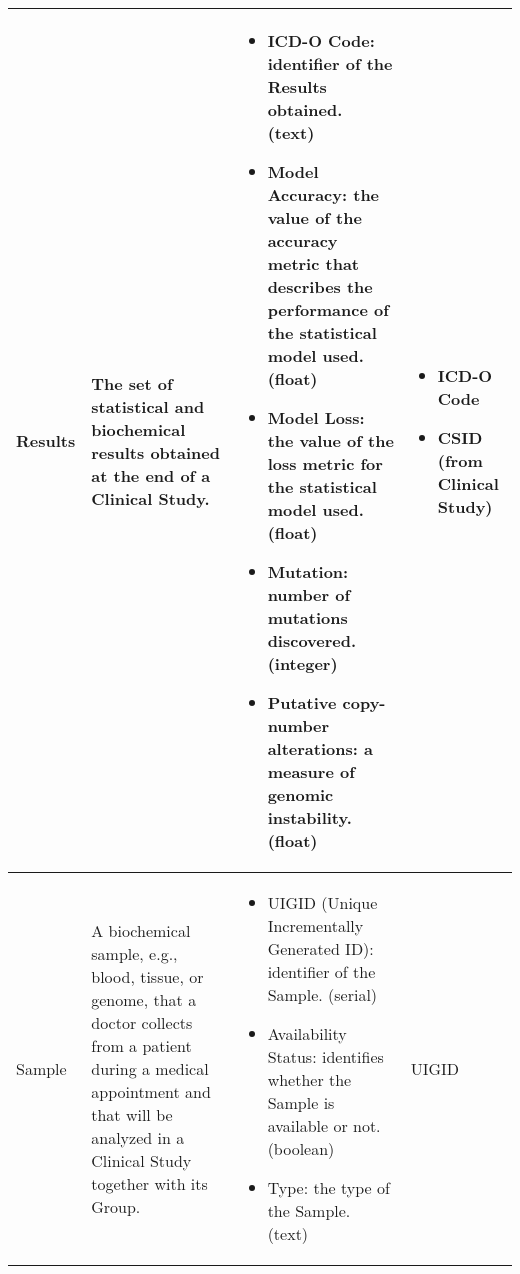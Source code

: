 \begin{longtable}{|p{}|p{} |p{}|p{} |}
Results & The set of statistical and biochemical results obtained at the end of a Clinical Study. & \begin{itemize}
        \vspace{-1em}
        \item ICD-O Code: identifier of the Results obtained. (text)
        \item Model Accuracy: the value of the accuracy metric that describes the performance of the statistical model used. (float)
        \item Model Loss: the value of the loss metric for the statistical model used. (float)
        \item Mutation: number of mutations discovered. (integer)
        \item Putative copy-number alterations: a measure of genomic instability. (float)
    \end{itemize}
 &  \begin{itemize}
    \vspace{-1em}
    \item ICD-O Code
    \item CSID (from Clinical Study)
 \end{itemize}
    \\\hline

Sample & A biochemical sample, e.g., blood, tissue, or genome, that a doctor collects from a patient during a medical appointment and that will be analyzed in a Clinical Study together with its Group. & \begin{itemize}
        \vspace{-1em}
        \item UIGID (Unique Incrementally Generated ID): identifier of the Sample. (serial)
        \item Availability Status: identifies whether the Sample is available or not. (boolean)
        \item Type: the type of the Sample. (text)
    \end{itemize}
 &  UIGID\\\hline
 
\end{longtable}